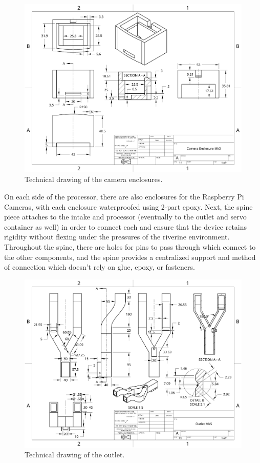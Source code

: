 \documentclass[fleqn,10pt]{SelfArx} %
\begin{document}
	\begin{figure}[h]
		\centering
		\includegraphics[width=1\linewidth]{Figures/TechCamBox}
		\caption[Camera Box Tech. Drawing]{Technical drawing of the camera enclosures.}
		\label{fig:techCamBox}
	\end{figure}
	On each side of the processor, there are also enclosures for the Raspberry Pi Cameras, with each enclosure waterproofed using 2-part epoxy. 
	\linebreak
	Next, the spine piece attaches to the intake and processor (eventually to the outlet and servo container as well) in order to connect each and ensure that the device retains rigidity without flexing under the pressures of the riverine environment. Throughout the spine, there are holes for pins to pass through which connect to the other components, and the spine provides a centralized support and method of connection which doesn’t rely on glue, epoxy, or fasteners. 
	\begin{figure}[h]
		\centering
		\includegraphics[width=1\linewidth]{Figures/TechOutlet}
		\caption[Outlet Tech. Drawing]{Technical drawing of the outlet.}
		\label{fig:techOutlet}
	\end{figure}
	
\end{document}
